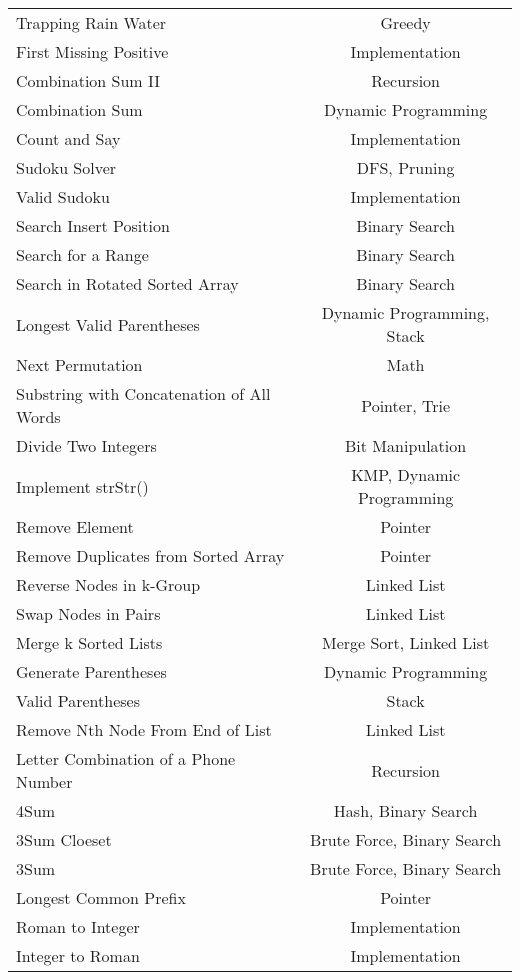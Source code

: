 \documentclass[paper=a4, fontsize=11pt]{scrartcl} %
\begin{document}
\begin{center}
\begin{longtable}{|l|c|}
    Trapping Rain Water     &   Greedy  \\
    First Missing Positive  &   Implementation  \\
    Combination Sum II  &   Recursion  \\
    Combination Sum &   Dynamic Programming \\
    Count and Say   &   Implementation  \\
    Sudoku Solver   &   DFS, Pruning \\
    Valid Sudoku    &   Implementation \\
    Search Insert Position  &   Binary Search   \\
    Search for a Range  &   Binary Search   \\
    Search in Rotated Sorted Array  &   Binary Search   \\
    Longest Valid Parentheses   &   Dynamic Programming, Stack   \\
    Next Permutation    &   Math    \\
    Substring with Concatenation of All Words   &   Pointer, Trie \\
    Divide Two Integers &   Bit Manipulation    \\
    Implement strStr()  &   KMP, Dynamic Programming  \\
    Remove Element  &   Pointer \\
    Remove Duplicates from Sorted Array &   Pointer \\
    Reverse Nodes in k-Group    &   Linked List \\
    Swap Nodes in Pairs     &   Linked List \\
    Merge k Sorted Lists    &   Merge Sort, Linked List\\
    Generate Parentheses    &   Dynamic Programming \\
    Valid Parentheses   &   Stack   \\
    Remove Nth Node From End of List    &   Linked List \\
    Letter Combination of a Phone Number    &   Recursion \\
    4Sum    &   Hash, Binary Search \\
    3Sum Cloeset    &   Brute Force, Binary Search \\
    3Sum    &   Brute Force, Binary Search \\
    Longest Common Prefix   &   Pointer \\
    Roman to Integer    &   Implementation  \\
    Integer to Roman    &   Implementation  \\

\end{longtable}
\end{center}
\end{document}
